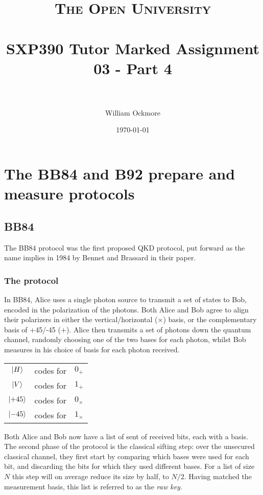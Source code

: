 \documentclass[paper=a4, fontsize=11pt]{scrartcl} %
\title{
\normalfont \normalsize
\textsc{The Open University} \\ [25pt] %
\horrule{0.5pt} \\[0.4cm] %
\huge SXP390 Tutor Marked Assignment 03 - Part 4 \\ %
\horrule{2pt} \\[0.5cm] %
}
\author{William Ockmore} %
\date{\normalsize\today} %
\numberwithin{equation}{section} %
\numberwithin{figure}{section} %
\numberwithin{table}{section} %
\begin{document}
\maketitle %


\section{The BB84 and B92 prepare and measure protocols}

\subsection{BB84}

The BB84 protocol was the first proposed QKD protocol, put forward as the name implies in
1984 by Bennet and Brassard in their paper. %

\subsubsection{The protocol}
In BB84, Alice uses a single photon source to transmit a set of states to Bob,
encoded in the polarization of the photons. Both Alice and Bob agree to align
their polarizers in either the vertical/horizontal ($\times$) basis, or the
complementary basis of +45/-45 ($+$). Alice then transmits a set of photons
down the quantum channel, randomly choosing one of the two bases for each
photon, whilst Bob measures in his choice of basis for each photon received.

\begin{center}
\begin{tabular}{c c c}
	$\ket{H}$  & codes for & $0_+$ \\
	$\ket{V}$  & codes for & $1_+$ \\
	$\ket{+45}$  & codes for & $0_\times$ \\
	$\ket{-45}$  & codes for & $1_\times$ \\
\end{tabular}
\end{center}

Both Alice and Bob now have a list of sent of received bits, each with a basis. The second
phase of the protocol is the classical sifting step: over the unsecured classical channel, they
first start by comparing which bases were used for each bit, and discarding the bits for which
they used different bases. For a list of size $N$ this step will on average reduce its size by half,
to $N/2$. Having matched the measurement basis, this list is referred to as the \textit{raw key}.
\end{document}
